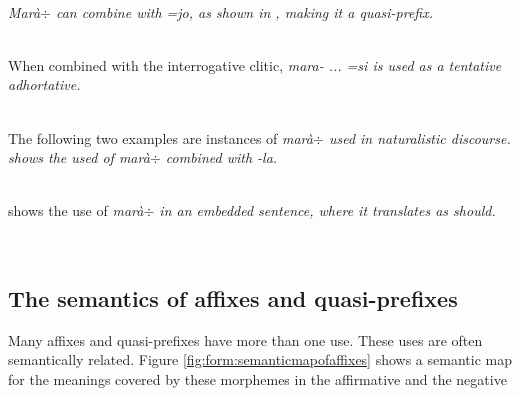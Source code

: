  \\
\em Marà$\div$ \em can combine with \em =jo\em, as shown in , making it a quasi-prefix.

 \\
When combined with the interrogative clitic, \em mara- ... =si \em is used as a tentative adhortative.

 \\


The following two examples are instances of \em marà$\div$ \em used in naturalistic discourse.  shows the used of \em marà$\div$ \em combined with \em -la\em.


 \\
 shows the use of \em marà$\div$ \em in an embedded sentence, where it translates as \em should\em.

 \\



\subsection{The semantics of affixes and quasi-prefixes}\label{sec:morph:Thesemanticsofaffixesandquasi-prefixes}
Many affixes and quasi-prefixes have more than one use. These uses are often semantically related. Figure \ref{fig:form:semanticmapofaffixes} shows a semantic map for the meanings covered by these morphemes in the affirmative and the negative

